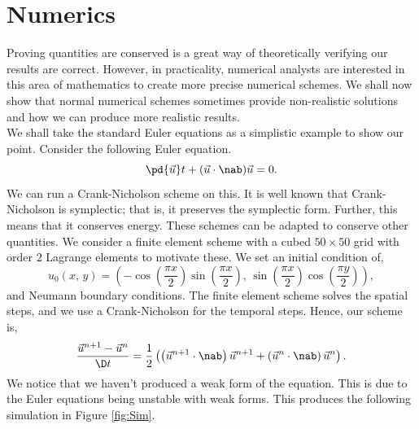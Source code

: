 
\section{Numerics}
Proving quantities are conserved is a great way of theoretically verifying our results are correct. However, in practicality, numerical analysts are interested in this area of mathematics to create more precise numerical schemes. We shall now show that normal numerical schemes sometimes provide non-realistic solutions and how we can produce more realistic results.\\

\noindent
We shall take the standard Euler equations as a simplistic example to show our point. Consider the following Euler equation.
$$ \pd {\vec u} t + ({\vec u} \cdot\nab){\vec u} = 0. $$
We can run a Crank-Nicholson scheme on this. It is well known that Crank-Nicholson is symplectic; that is, it preserves the symplectic form. Further, this means that it conserves energy. These schemes can be adapted to conserve other quantities. We consider a finite element scheme with a cubed $50\times 50$ grid with order $2$ Lagrange elements to motivate these. We set an initial condition of,
$$ u_0(x,\, y) = \left( -\cos \left( \frac{\pi x}{2} \right)\sin \left( \frac{\pi x}{2} \right),\, \sin\left( \frac{\pi x}{2} \right)\cos \left( \frac{\pi y}{2} \right) \right), $$
and Neumann boundary conditions. The finite element scheme solves the spatial steps, and we use a Crank-Nicholson for the temporal steps. Hence, our scheme is,
$$ \frac{{\vec u}^{n+1} - {\vec u}^n}{\D t} = \frac{1}{2}\left( \left({\vec u}^{n+1} \cdot \nab\right){\vec u}^{n+1} + \left({\vec u}^{n} \cdot \nab\right){\vec u}^{n}\right). $$
We notice that we haven't produced a weak form of the equation. This is due to the Euler equations being unstable with weak forms.
This produces the following simulation in Figure \ref{fig:Sim}.

